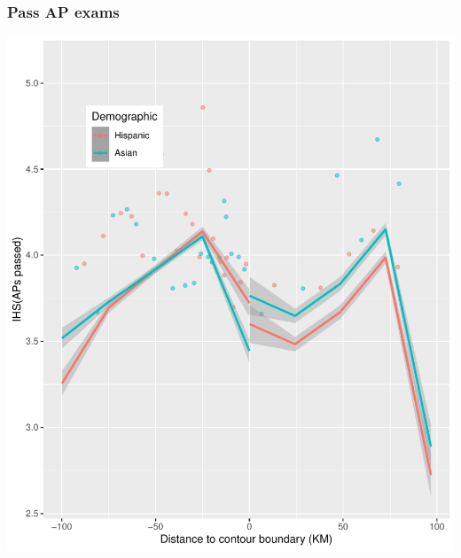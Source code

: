 \documentclass{beamer}
\begin{document}
\begin{frame}
\frametitle{Pass AP exams}
\begin{center}
\includegraphics[width=.6\textwidth]{../../analysis/Output/graphs/appassed.pdf} 
\end{center}
\end{frame}
\end{document}
